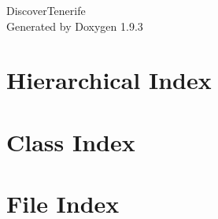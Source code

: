 \documentclass[twoside]{book}
\newcommand{\+}{\discretionary{\mbox{\scriptsize$\hookleftarrow$}}{}{}}
\newcommand{\clearemptydoublepage}{%
    \newpage{\pagestyle{empty}\cleardoublepage}%
  }
\begin{document}
  \raggedbottom
    \hypersetup{pageanchor=false,
                bookmarksnumbered=true,
                pdfencoding=unicode
               }
  \begin{titlepage}
  \vspace*{7cm}
  \begin{center}%
  {\Large Discover\+Tenerife}\\
  \vspace*{1cm}
  {\large Generated by Doxygen 1.9.3}\\
  \end{center}
  \end{titlepage}
  \clearemptydoublepage
  \tableofcontents
  \clearemptydoublepage
  \hypersetup{pageanchor=true}
\chapter{Hierarchical Index}

\chapter{Class Index}

\chapter{File Index}

\end{document}
